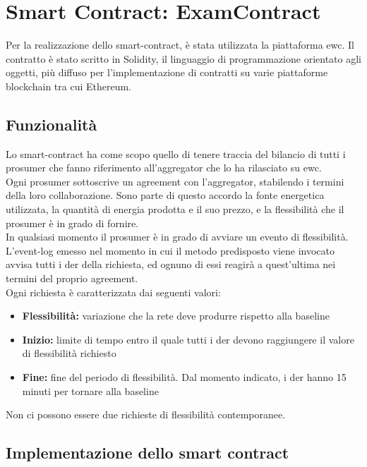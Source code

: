 \section{Smart Contract: ExamContract}

Per la realizzazione dello \gls{smart-contract}, è stata utilizzata la piattaforma \gls{ewc}.
Il contratto è stato scritto in Solidity, il linguaggio di programmazione orientato agli oggetti, più diffuso per l'implementazione di contratti su varie piattaforme blockchain tra cui Ethereum. \\

\subsection{Funzionalità}
Lo \gls{smart-contract} ha come scopo quello di tenere traccia del bilancio di tutti i \gls{prosumer} che fanno riferimento all'\gls{aggregator} che lo ha rilasciato su \gls{ewc}. \\
Ogni \gls{prosumer} sottoscrive un \gls{agreement} con l'\gls{aggregator}, stabilendo i termini della loro collaborazione.
Sono parte di questo accordo la fonte energetica utilizzata, la quantità di energia prodotta e il suo prezzo, e la flessibilità che il \gls{prosumer} è in grado di fornire. \\
In qualsiasi momento il \gls{prosumer} è in grado di avviare un evento di flessibilità.
L'\gls{event-log} emesso nel momento in cui il metodo predisposto viene invocato avvisa tutti i \gls{der} della richiesta,
ed ognuno di essi reagirà a quest'ultima nei termini del proprio \gls{agreement}. \\
Ogni richiesta è caratterizzata dai seguenti valori:
\begin{itemize}
    \item \textbf{Flessibilità:} variazione che la rete deve produrre rispetto alla \gls{baseline}
    \item \textbf{Inizio:} limite di tempo entro il quale tutti i \gls{der} devono raggiungere il valore di flessibilità richiesto
    \item \textbf{Fine:} fine del periodo di flessibilità. Dal momento indicato, i \gls{der} hanno 15 minuti per tornare alla baseline
\end{itemize} 
Non ci possono essere due richieste di flessibilità contemporanee.

\subsection{Implementazione dello smart contract}

